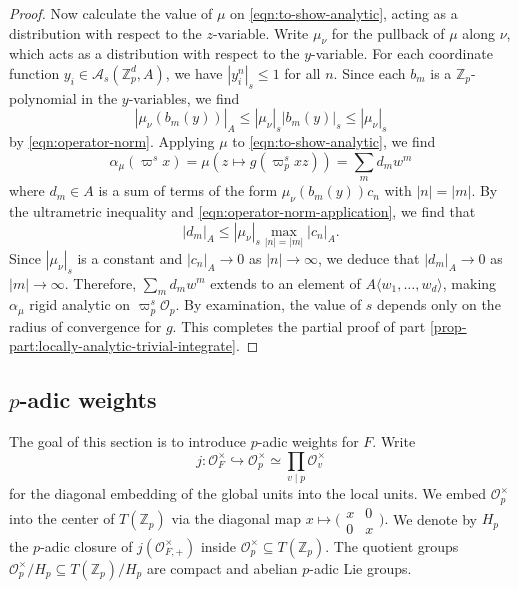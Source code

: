 \documentclass[10pt, twoside]{amsart}
\theoremstyle{plain}
\theoremstyle{definition}
\theoremstyle{remark}
\numberwithin{equation}{subsection}
\def\Z{\mathbb Z}
\def\scro{\mathscr O}
\def\scra{\mathscr A}
\def\scro{\mathscr O}
\newcommand{\smallmat}[4]{\bigl(\begin{smallmatrix}#1&#2\\#3&#4\end{smallmatrix}\bigr)}
\begin{document}
\begin{proof}
Now calculate the value of $\mu$ on \eqref{eqn:to-show-analytic}, acting as a distribution with respect to the $z$-variable. Write $\mu_{\nu}$ for the pullback of $\mu$ along $\nu$, which acts as a distribution with respect to the $y$-variable. For each coordinate function $y_i \in \scra_s(\Z_p^d,A)$, we have $|y_i^n|_s \leq 1$ for all $n$. Since each $b_m$ is a $\Z_p$-polynomial in the $y$-variables, we find
\begin{equation}\label{eqn:operator-norm-application}
|\mu_\nu(b_m(y))|_A \leq |\mu_{\nu}|_s |b_m(y)|_s \leq |\mu_{\nu}|_s
\end{equation}
by \eqref{eqn:operator-norm}. Applying $\mu$ to \eqref{eqn:to-show-analytic}, we find
$$
\alpha_\mu(\varpi^s x) = \mu(z \mapsto g(\varpi_p^s xz)) = \sum_m d_m w^m
$$
where $d_m \in A$ is a sum of terms of the form $\mu_{\nu}(b_m(y))c_n$ with $|n| = |m|$. By the ultrametric inequality and \eqref{eqn:operator-norm-application}, we find that
$$
|d_m|_A \leq |\mu_{\nu}|_s \max_{|n|=|m|} |c_n|_A.
$$
Since $|\mu_\nu|_s$ is a constant and $|c_n|_A \rightarrow 0$ as $|n| \rightarrow \infty$, we deduce that $|d_m|_A \rightarrow 0$ as $|m| \rightarrow \infty$. Therefore, $\sum_m d_m w^m$ extends to an element of $A\langle w_1,\dotsc,w_d\rangle$, making $\alpha_\mu$ rigid analytic on $\varpi_p^s \scro_p$. By examination, the value of $s$ depends only on the radius of convergence for $g$. This completes the partial proof of part \ref{prop-part:locally-analytic-trivial-integrate}.\end{proof}

\subsection{$p$-adic weights}\label{weight section}
The goal of this section is to introduce $p$-adic weights for $F$.  Write 
$$
j: \scro_F^\times \hookrightarrow \scro_p^\times \simeq \prod_{v \mid p} \scro_v^\times
$$ 
for the diagonal embedding of the global units into the local  units. 
{We embed $\scro_p^\times$ into the center of $T(\Z_p)$ via the diagonal map $x\mapsto \smallmat x00x$.} 
We denote by $H_p$ the $p$-adic closure of $j(\scro_{F,+}^\times)$ inside $ \scro_p^\times \subseteq T(\Z_p)$. The quotient groups $\scro_p^\times/H_p \subseteq T(\Z_p)/H_p$ are compact and abelian $p$-adic Lie groups.
\end{document}
